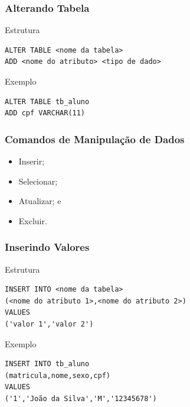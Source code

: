 \documentclass{beamer}
\begin{document}
\begin{frame}[fragile]
\frametitle{Alterando Tabela}

\begin{block}{Estrutura}
\begin{lstlisting}
ALTER TABLE <nome da tabela> 
ADD <nome do atributo> <tipo de dado>
\end{lstlisting}
\end{block}\vfill

\begin{exampleblock}{Exemplo}
\begin{lstlisting}
ALTER TABLE tb_aluno
ADD cpf VARCHAR(11)
\end{lstlisting}
\end{exampleblock}
\end{frame}

\begin{frame}
\frametitle{Comandos de Manipulação de Dados}

\begin{itemize}
	\item Inserir;
	\item Selecionar;
	\item Atualizar; e
	\item Excluir.
\end{itemize}
\end{frame}

\begin{frame}[fragile]
\frametitle{Inserindo Valores}

\begin{block}{Estrutura}
\begin{lstlisting}
INSERT INTO <nome da tabela>
(<nome do atributo 1>,<nome do atributo 2>)
VALUES
('valor 1','valor 2')
\end{lstlisting}
\end{block}\vfill

\begin{exampleblock}{Exemplo}
\begin{lstlisting}
INSERT INTO tb_aluno
(matricula,nome,sexo,cpf)
VALUES
('1','João da Silva','M','12345678')
\end{lstlisting}
\end{exampleblock}
\end{frame}
\end{document}
